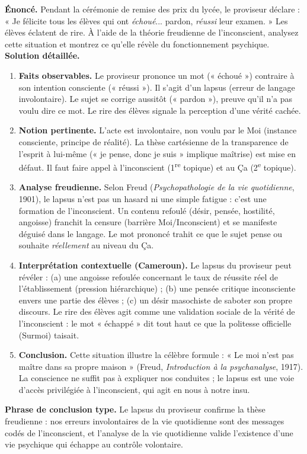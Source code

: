 \documentclass[11pt]{article}
\newcommand{\cle}[1]{{\popxbold\color{popdark}#1}}
\begin{document}
\begin{exoresolu}
\textbf{Énoncé.} Pendant la cérémonie de remise des prix du lycée, le proviseur déclare : « Je félicite tous les élèves qui ont \emph{échoué}... pardon, \emph{réussi} leur examen. » Les élèves éclatent de rire. À l'aide de la théorie freudienne de l'inconscient, analysez cette situation et montrez ce qu'elle révèle du fonctionnement psychique.
\tcblower
\textbf{Solution détaillée.}
\begin{enumerate}
\item \textbf{Faits observables.} Le proviseur prononce un mot (« échoué ») contraire à son intention consciente (« réussi »). Il s'agit d'un \cle{lapsus} (erreur de langage involontaire). Le sujet se corrige aussitôt (« pardon »), preuve qu'il n'a pas voulu dire ce mot. Le rire des élèves signale la perception d'une vérité cachée.
\item \textbf{Notion pertinente.} L'acte est involontaire, non voulu par le \cle{Moi} (instance consciente, principe de réalité). La thèse cartésienne de la transparence de l'esprit à lui-même (« je pense, donc je suis » implique maîtrise) est mise en défaut. Il faut faire appel à l'\cle{inconscient} (1\textsuperscript{re} topique) et au \cle{Ça} (2\textsuperscript{e} topique).
\item \textbf{Analyse freudienne.} Selon Freud (\emph{Psychopathologie de la vie quotidienne}, 1901), le lapsus n'est pas un hasard ni une simple fatigue : c'est une \cle{formation de l'inconscient}. Un contenu refoulé (désir, pensée, hostilité, angoisse) franchit la \cle{censure} (barrière Moi/Inconscient) et se manifeste déguisé dans le langage. Le mot prononcé trahit ce que le sujet pense ou souhaite \emph{réellement} au niveau du Ça.
\item \textbf{Interprétation contextuelle (Cameroun).} Le lapsus du proviseur peut révéler : (a) une angoisse refoulée concernant le taux de réussite réel de l'établissement (pression hiérarchique) ; (b) une pensée critique inconsciente envers une partie des élèves ; (c) un désir masochiste de saboter son propre discours. Le rire des élèves agit comme une \cle{validation sociale} de la vérité de l'inconscient : le mot « échappé » dit tout haut ce que la politesse officielle (Surmoi) taisait.
\item \textbf{Conclusion.} Cette situation illustre la célèbre formule : « Le moi n'est pas maître dans sa propre maison » (Freud, \emph{Introduction à la psychanalyse}, 1917). La conscience ne suffit pas à expliquer nos conduites ; le lapsus est une voie d'accès privilégiée à l'inconscient, qui agit en nous à notre insu.
\end{enumerate}
\textbf{Phrase de conclusion type.} Le lapsus du proviseur confirme la thèse freudienne : nos erreurs involontaires de la vie quotidienne sont des messages codés de l'inconscient, et l'analyse de la vie quotidienne valide l'existence d'une vie psychique qui échappe au contrôle volontaire.
\end{exoresolu}
\end{document}
